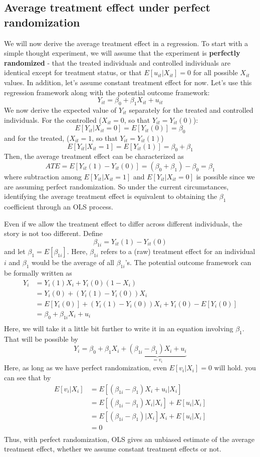 \documentclass[12pt]{article}
\theoremstyle{definition}
\theoremstyle{property}
\theoremstyle{assumption}
\theoremstyle{example}
\theoremstyle{comment}
\begin{document}
\subsection{Average treatment effect under perfect randomization}
We will now derive the average treatment effect in a regression. To start with a simple thought experiment, we will assume that the experiment is \textbf{perfectly randomized} - that the treated individuals and controlled individuals are identical except for treatment status, or that $E[u_{it}|X_{it}]=0$ for all possible $X_{it}$ values. In addition, let's assume constant treatment effect for now. Let's use this regression framework along with the potential outcome framework:
\[
Y_{it} = \beta_0 + \beta_1 X_{it}+u_{it}
\] 
We now derive the expected value of $Y_{it}$ separately for the treated and controlled individuals. For the controlled ($X_{it}=0$, so that $Y_{it}=Y_{it}(0)$):
\[
E[Y_{it}|X_{it}=0]=E[Y_{it}(0)]=\beta_0
\]
and for the treated, ($X_{it}=1$, so that $Y_{it}=Y_{it}(1)$)
\[
E[Y_{it}|X_{it}=1]=E[Y_{it}(1)]=\beta_0+\beta_1
\]
Then, the average treatment effect can be characterized as
\[
ATE = E[Y_{it}(1)-Y_{it}(0)]=(\beta_0+\beta_1)-\beta_0=\beta_1
\]
where subtraction among $E[Y_{it}|X_{it}=1]$ and $E[Y_{it}|X_{it}=0]$ is possible since we are assuming perfect randomization. So under the current circumstances, identifying the average treatment effect is equivalent to obtaining the $\beta_1$ coefficient through an OLS process.
\par\medskip
Even if we allow the treatment effect to differ across different individuals, the story is not too different. Define
\[
\beta_{1i}= Y_{it}(1)-Y_{it}(0)
\]
and let $\beta_1=E[\beta_{1i}]$. Here, $\beta_{1i}$ refers to a (raw) treatment effect for an individual $i$ and $\beta_1$ would be the average of all $\beta_{1i}$'s. The potential outcome framework can be formally written as
\[
\begin{aligned}
Y_i & = Y_i(1)X_i+Y_i(0)(1-X_i)\\
&=Y_i(0)+(Y_i(1)-Y_i(0))X_i \\
&=E[Y_i(0)]+(Y_i(1)-Y_i(0))X_i+Y_i(0)-E[Y_i(0)]\\
&=\beta_0+\beta_{1i}X_i+u_i   \\
\end{aligned} 
\]
Here, we will take it a little bit further to write it in an equation involving $\beta_1$. That will be possible by
\[
Y_i = \beta_0 + \beta_1X_i+\underbrace{(\beta_{1i}-\beta_1)X_i+u_i}_{=v_i}
\]
Here, as long as we have perfect randomization, even $E[v_i|X_i]=0$ will hold. you can see that by
\[
\begin{aligned}
E[v_i|X_i]&=E[(\beta_{1i}-\beta_1)X_i+u_i|X_i]\\
&=E[(\beta_{1i}-\beta_1)X_i|X_i]+E[u_i|X_i]\\
&=E[(\beta_{1i}-\beta_1)|X_i]X_i+E[u_i|X_i]\\
&=0\\
\end{aligned}
\]
Thus, with perfect randomization, OLS gives an unbiased estimate of the average treatment effect, whether we assume constant treatment effects or not. 
\end{document}
